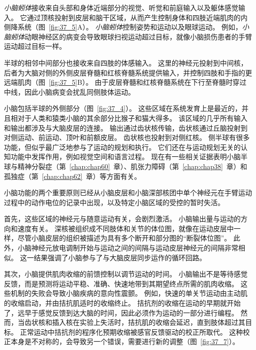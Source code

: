 \textit{小脑蚓体}接收来自头部和身体近端部分的视觉、听觉和前庭输入以及躯体感觉输入。
它通过顶核投射到皮层和脑干区域，从而产生控制身体和四肢近端肌肉的内侧降系统（图~\ref{fig:37_5}A）。
\textit{小脑蚓体}控制姿势和运动以及眼球运动。
例如，\textit{小脑蚓体}动眼神经区的病变会导致眼球扫视运动超过目标，就像小脑损伤患者的手臂运动超过目标一样。


半球的相邻中间部分也接收来自四肢的体感输入。
这里的神经元投射到中间核，后者为大脑对侧的外侧皮层脊髓和红核脊髓系统提供输入，并控制四肢和手指的更远端肌肉（图~\ref{fig:37_5}B）。
由于皮层脊髓和红核脊髓系统在下行至脊髓时穿过中线，因此小脑病变会扰乱同侧肢体运动。


小脑包括半球的外侧部分（图~\ref{fig:37_4}）。
这些区域在系统发育上是最近的，并且相对于人类和猿类小脑的其余部分比猴子和猫大得多。
该区域的几乎所有输入和输出都涉及与大脑皮层的连接。
输出通过齿状核传输，齿状核通过丘脑投射到对侧运动、前运动、顶叶和前额皮层。
齿状核也投射到对侧红核。
侧半球有很多功能，但似乎最广泛地参与了运动的规划和执行。
它们还在与运动规划无关的认知功能中发挥作用，例如视觉空间和语言过程。
现在有一些相关证据表明小脑半球与精神分裂症（第~\ref{chap:chap60}~章）、肌张力障碍（第~\ref{chap:chap38}~章）和孤独症（第~\ref{chap:chap62}~章）等方面有关。


小脑功能的两个重要原则已经从小脑皮层和小脑深部核团中单个神经元在手臂运动过程中的动作电位的记录中出现，以及特定小脑区域的受控的暂时失活。


首先，这些区域的神经元与随意运动有关，会剧烈激活。
小脑输出量与运动的方向和速度有关。
深核被组织成不同肢体和关节的体位图，就像在运动皮层中一样，尽管小脑皮层的组织被描述为具有多个断开和部分图的“断裂体位图”。
此外，小脑神经元放电调制开始与运动之间的间隔与运动皮层神经元的间隔非常相似。
这一结果强调了小脑参与了与大脑皮层同步运作的循环回路。


其次，小脑提供肌肉收缩的前馈控制以调节运动的时间。
小脑输出不是等待感觉反馈，而是预测将运动平稳、准确、快速地带到其期望终点所需的肌肉收缩。
这些机制的失败会导致小脑疾病的意向性震颤。
例如，快速的单关节运动由主动肌的收缩启动，并由拮抗肌适时的收缩终止。
拮抗剂的收缩在运动的早期就开始了，远早于感觉反馈到达大脑的时间，因此必须作为运动的一部分进行编程。
然而，当齿状核和插入核在实验上失活时，拮抗肌的收缩会延迟，直到肢体超过其目标。
正常运动中拮抗剂的程序化预期收缩被感官反馈驱动的校正所取代。
这种校正本身是不对称的，会导致另一个错误，需要进行新的调整（图~\ref{fig:37_7}）。


